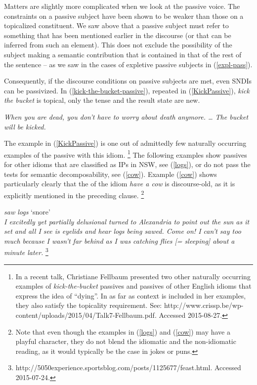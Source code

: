 \documentclass[output=paper]{langsci/langscibook}
\begin{document}
Matters are slightly more complicated when we look at the  passive voice. The constraints on a passive subject have been shown to be weaker than those on a topi\-ca\-lized constituent. We saw above that a passive subject must refer to something that has been mentioned earlier in the discourse (or that can be inferred from such an element). This does not exclude the possibility of the subject making a semantic contribution that is contained in that of the rest of the sentence -- as we saw in the cases of  expletive passive subjects in (\ref{expl-pass}). 

\newpage 
Consequently, if the discourse conditions  on passive subjects are met, even  SNDIs can be passivized. In (\ref{kick-the-bucket-passive}), repeated in (\ref{KickPassive}), \textit{kick the bucket} is topical, only the tense and the result state are new. 

\begin{exe}
\ex \textit{When you are dead, you don't have to worry about death anymore. {\ldots}
The bucket will be kicked.}\label{KickPassive}
\end{exe}

The example in (\ref{KickPassive}) is one out of admittedly few naturally occurring examples of the passive with this idiom.%
\footnote{In a recent talk,   Christiane Fellbaum presented two other naturally occurring examples of \textit{kick-the-bucket} passives and passives of other English idioms that express the idea of ``dying''. In as far as context is included in her examples, they also satisfy the  topicality requirement. See: http://www.crissp.be/wp-content/uploads/2015/04/Talk7-Fellbaum.pdf. Accessed 2015-08-27.}
%
The following examples show  passives for other idioms that are classified as IPs in NSW, see (\ref{logs}), or do not pass the tests for semantic decomposability, see (\ref{cow}). Example (\ref{cow}) shows particularly clearly that the  of the idiom \textit{have a cow} is discourse-old, as it is explicitly mentioned in the preceding clause.%
\footnote{Note that even though the examples in  (\ref{logs}) and (\ref{cow}) may have a playful character, they do not blend the idiomatic and the non-idiomatic reading, 
as it would typically be the case in jokes or puns.
}

\begin{exe}
\ex \textit{saw logs} `snore'\label{logs}\\
\textit{I excitedly yet partially delusional turned to Alexandria to point out the sun as it set and all I see is eyelids and hear \emph{logs being sawed}. Come on! I can't say too much because I wasn't far behind as I was catching flies [= sleeping] about a minute later.}%
\footnote{http://5050experience.sportsblog.com/posts/1125677/feast.html. Accessed 2015-07-24.}
\end{exe}
\end{document}
